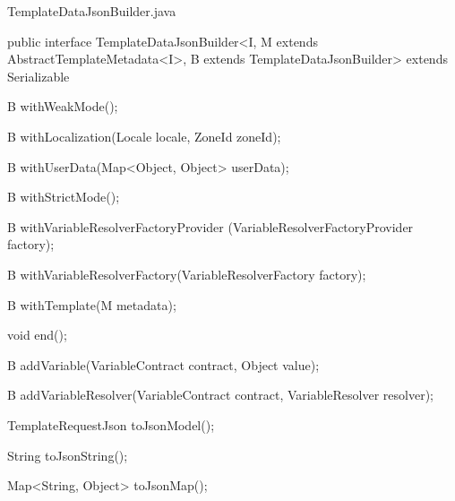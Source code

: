 \begin{program}[h]
\caption{TemplateDataJsonBuilder.java}
\label{prog:templateDataJsonBuilder}
\begin{JavaCode}
public interface TemplateDataJsonBuilder<I,
    M extends AbstractTemplateMetadata<I>,
    B extends TemplateDataJsonBuilder> extends Serializable {

    B withWeakMode();

    B withLocalization(Locale locale,
                       ZoneId zoneId);

    B withUserData(Map<Object, Object> userData);

    B withStrictMode();

    B withVariableResolverFactoryProvider
                         (VariableResolverFactoryProvider factory);

    B withVariableResolverFactory(VariableResolverFactory factory);

    B withTemplate(M metadata);

    void end();

    B addVariable(VariableContract contract,
                  Object value);

    B addVariableResolver(VariableContract contract,
                          VariableResolver resolver);

    TemplateRequestJson toJsonModel();

    String toJsonString();

    Map<String, Object> toJsonMap();
}
\end{JavaCode}
\end{program}
\ \newpage

